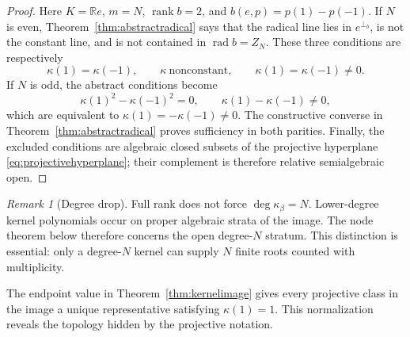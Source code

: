 \documentclass[11pt,a4paper]{article}
\theoremstyle{definition}
\theoremstyle{remark}
\newtheorem{remark}[theorem]{Remark}
\newcommand{\R}{\mathbb{R}}
\newcommand{\rank}{\operatorname{rank}}
\newcommand{\Rad}{\operatorname{rad}}
\begin{document}
\begin{proof}
Here $K=\R e$, $m=N$, $\rank b=2$, and
$b(e,p)=p(1)-p(-1)$.  If $N$ is even,
Theorem~\ref{thm:abstractradical} says that the radical line lies in $e^{\perp_b}$, is not
the constant line, and is not contained in $\Rad b=Z_N$.  These three conditions are
respectively
\[
 \kappa(1)=\kappa(-1),\qquad \kappa\ \text{nonconstant},\qquad
 \kappa(1)=\kappa(-1)\neq0.
\]
If $N$ is odd, the abstract conditions become
\[
 \kappa(1)^2-\kappa(-1)^2=0,\qquad
 \kappa(1)-\kappa(-1)\neq0,
\]
which are equivalent to
$\kappa(1)=-\kappa(-1)\neq0$.  The constructive converse in
Theorem~\ref{thm:abstractradical} proves sufficiency in both parities.  Finally, the excluded
conditions are algebraic closed subsets of the projective hyperplane
\eqref{eq:projectivehyperplane}; their complement is therefore relative semialgebraic open.
\end{proof}

\begin{remark}[Degree drop]
Full rank does not force $\deg\kappa_\beta=N$.  Lower-degree kernel polynomials occur on
proper algebraic strata of the image.  The node theorem below therefore concerns the open
degree-$N$ stratum.  This distinction is essential: only a degree-$N$ kernel can supply $N$
finite roots counted with multiplicity.
\end{remark}

The endpoint value in Theorem~\ref{thm:kernelimage} gives every projective class in the
image a unique representative satisfying $\kappa(1)=1$.  This normalization reveals the
topology hidden by the projective notation.
\end{document}
